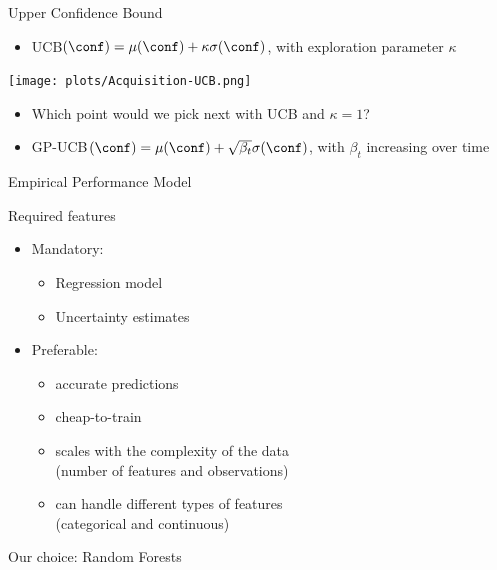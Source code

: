 \begin{frame}[c,fragile]{Upper Confidence Bound}
\begin{itemize}
\vspace*{-0.2cm}
  \item UCB$(\conf) = \mu(\conf) + \kappa\sigma(\conf)$, with exploration parameter $\kappa$
\end{itemize}
\vspace*{-0.2cm}  
\centering
\texttt{[image: plots/Acquisition-UCB.png]} 
\vspace*{0.2cm}  
\begin{itemize}
\item Which point would we pick next with UCB and $\kappa = 1$? \hands
\mypause
 \item GP-UCB$(\conf) = \mu(\conf) + \sqrt{\beta_t} \sigma(\conf)$, with $\beta_t$ \alert{increasing} over time
\end{itemize}

\end{frame}

\begin{frame}[c,fragile]{Empirical Performance Model}

Required features

\begin{itemize}
  \item Mandatory:
  \begin{itemize}
    \item Regression model
	\item Uncertainty estimates
  \end{itemize}
  \pause
  \item Preferable:
  \begin{itemize}
    \item accurate predictions
    \item cheap-to-train
    \item scales with the complexity of the data\\ (number of features and observations)
    \item can handle different types of features\\ (categorical and continuous)
  \end{itemize}
\end{itemize}

\pause
Our choice: Random Forests

\end{frame}

